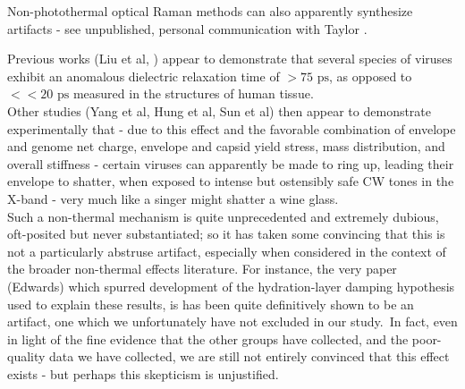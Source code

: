 \documentclass[paper.tex]{subfiles}
\begin{document}
\begin{multicols}{1}
Non-photothermal optical Raman methods can also apparently synthesize artifacts - see unpublished, personal communication with Taylor \cite{mechanisms1981}. 



























Previous works (Liu et al, ) appear to demonstrate that several species of viruses exhibit an anomalous dielectric relaxation time of $> 75 \text{ ps}$, as opposed to $<< 20 \text{ ps}$ \footnotemark measured in the structures of human tissue.\\

Other studies (Yang et al, Hung et al, Sun et al) then appear to demonstrate experimentally that - due to this effect and the favorable combination of envelope and genome net charge, envelope and capsid yield stress, mass distribution, and overall stiffness - certain viruses can  apparently be made to ring up, leading their envelope to shatter, when exposed to intense but ostensibly safe CW tones in the X-band - very much like a singer might shatter a wine glass.\\

Such a non-thermal mechanism is quite unprecedented and extremely dubious, oft-posited but never substantiated; so it has taken some convincing that this is not a particularly abstruse artifact, especially when considered in the context of the broader non-thermal effects literature. For instance, the very paper (Edwards) which spurred development of the hydration-layer damping hypothesis used to explain these results, is has been quite\cite{Resonances1987} definitively\cite{Microwave1993a} shown to be an artifact, one which we unfortunately have not excluded in our study.\footnotemark \ In fact, even in light of the fine evidence that the other groups have collected, and the poor-quality data we have collected, we are still not entirely convinced that this effect exists - but perhaps this skepticism is unjustified.\\



\end{multicols}
\end{document}
